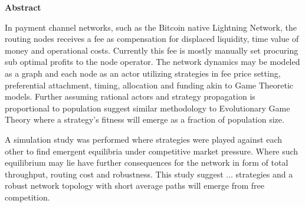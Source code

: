 \begin{center}
	\textbf{Abstract}
\end{center} 

In payment channel networks, such as the Bitcoin native Lightning Network, the routing nodes receives a fee as compensation for displaced liquidity, time value of money and operational costs. Currently this fee is mostly manually set procuring sub optimal profits to the node operator. The network dynamics may be modeled as a graph and each node as an actor utilizing strategies in fee price setting, preferential attachment, timing, allocation and funding akin to Game Theoretic models. Further assuming rational actors and strategy propagation is proportional to population suggest similar methodology to Evolutionary Game Theory where a strategy's fitness will emerge as a fraction of population size. 

A simulation study was performed where strategies were played against each other to find emergent equilibria under competitive market pressure. Where such equilibrium may lie have further consequences for the network in form of total throughput, routing cost and robustness. This study suggest ... strategies and a robust network topology with short average paths will emerge from free competition.

